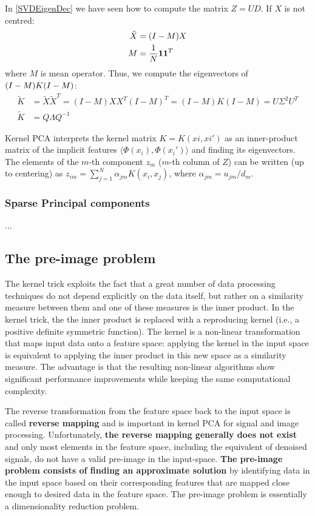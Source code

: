 \documentclass[12pt, letterpaper]{article}
\theoremstyle{definition}
\DeclarePairedDelimiter\autobracket{(}{)}
\newcommand{\br}[1]{\autobracket*{#1}}
\let\tb\textbf
\begin{document}
In \ref{SVDEigenDec} we have seen how to compute the matrix $Z=UD$.
If $X$ is not centred:
\begin{equation}
\begin{aligned}
\tilde{X} &= \br{I - M}X\\
M &= \frac{1}{N}\mathbf{1}\mathbf{1}^T
\end{aligned}
\end{equation}
where $M$ is mean operator. Thus, we compute the eigenvectors of $\br{I-M}K\br{I-M}$:
\begin{equation}
\begin{aligned}
\tilde{K} &= \tilde{X}\tilde{X}^T = (I-M)XX^T(I-M)^T = (I-M)K(I-M) = U\Sigma^2U^T\\
\tilde{K} &= Q\Lambda Q^{-1}
\end{aligned}
\end{equation}

Kernel PCA interprets the kernel matrix $K = {K(xi,xi')}$ as an inner-product matrix of the implicit features $\langle\Phi(x_i ), \Phi(x_i')\rangle$ and finding its eigenvectors. 
The elements of the $m$-th component $z_m$ ($m$-th column of $Z$) can be written (up to centering) as $z_{im} = \sum^N_{j=1} \alpha_{jm}K(x_i, x_j )$, where $\alpha_{jm} = u_{jm}/d_m$.

\subsubsection{Sparse Principal components}
...
\subsection{The pre-image problem}
The kernel trick exploits the fact that a great number of data processing techniques do not depend explicitly on the data itself, but rather on a similarity measure between them and one of these measures is the inner product. In the kernel trick, the the inner product is replaced with a reproducing kernel (i.e.,  a positive definite symmetric function). The kernel is a non-linear transformation that maps input data onto a feature space: applying the kernel in the input space is equivalent to applying the inner product in this new space as a similarity measure. The advantage is that the resulting non-linear algorithms show significant performance improvements while keeping the same computational complexity.

The reverse transformation from the feature space back to the input space is called \tb{reverse mapping} and is important in kernel PCA for signal and image processing. Unfortunately, \tb{the reverse mapping generally does not exist} and only most elements in the feature space, including the equivalent of denoised signals, do not have a valid pre-image in the input-space. \tb{The pre-image problem consists of finding an approximate solution} by identifying data in the input space based on their corresponding features that are mapped close enough to desired data in the feature space. The pre-image problem is essentially a dimensionality reduction problem.
\end{document}
